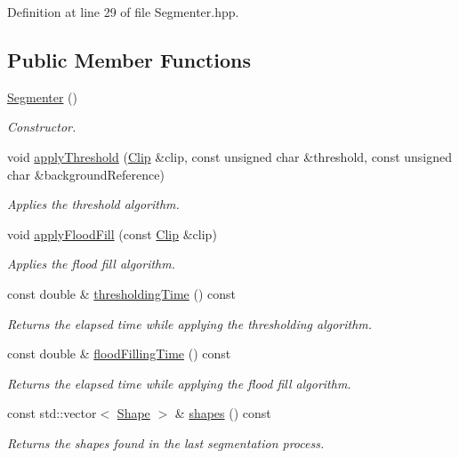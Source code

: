 Definition at line 29 of file Segmenter.hpp.\subsection*{Public Member Functions}
\begin{CompactItemize}
\item 
\hyperlink{class_segmenter_d39ec3bda31be180820aa0bdca7b125d}{Segmenter} ()
\begin{CompactList}\small\item\em Constructor. \item\end{CompactList}\item 
void \hyperlink{class_segmenter_6854315e3320f9d9a8ece14cbb8570ee}{applyThreshold} (\hyperlink{class_clip}{Clip} \&clip, const unsigned char \&threshold, const unsigned char \&backgroundReference)
\begin{CompactList}\small\item\em Applies the threshold algorithm. \item\end{CompactList}\item 
void \hyperlink{class_segmenter_327c88f2d55cb606a67ce778c06cf426}{applyFloodFill} (const \hyperlink{class_clip}{Clip} \&clip)
\begin{CompactList}\small\item\em Applies the flood fill algorithm. \item\end{CompactList}\item 
const double \& \hyperlink{class_segmenter_52f771c61d667df4f552ee73dc9f22e7}{thresholdingTime} () const 
\begin{CompactList}\small\item\em Returns the elapsed time while applying the thresholding algorithm. \item\end{CompactList}\item 
const double \& \hyperlink{class_segmenter_e7c93cb16e314baeb713bbd6ca9b667b}{floodFillingTime} () const 
\begin{CompactList}\small\item\em Returns the elapsed time while applying the flood fill algorithm. \item\end{CompactList}\item 
const std::vector$<$ \hyperlink{class_shape}{Shape} $>$ \& \hyperlink{class_segmenter_f2dd7f34c8b0f902323005335e41bd57}{shapes} () const 
\begin{CompactList}\small\item\em Returns the shapes found in the last segmentation process. \item\end{CompactList}\end{CompactItemize}
